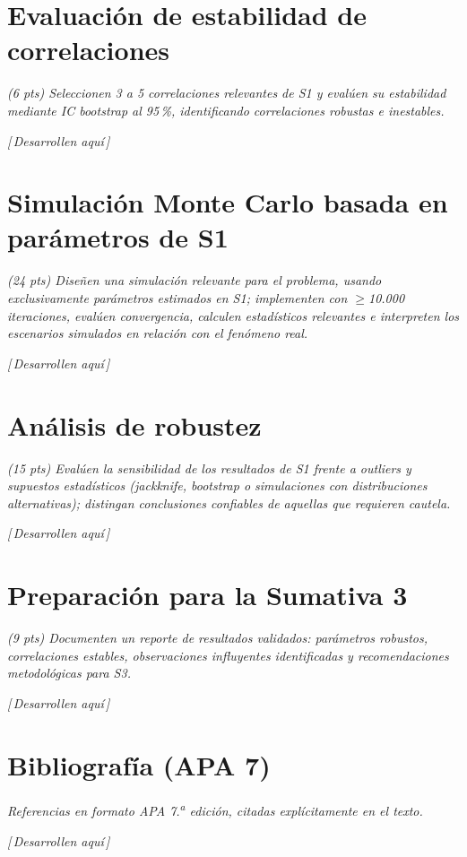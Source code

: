 \documentclass[11pt,a4paper]{article}
\newcommand{\guia}[1]{{\small\itshape\color{gris}#1}\par\vspace{0.15em}}
\newcommand{\resp}{{\footnotesize\itshape\color{fillgray}[\,Desarrollen aquí\,]}\par\vspace{1.1em}}
\begin{document}
\section{Evaluación de estabilidad de correlaciones}
\guia{(6 pts) Seleccionen 3 a 5 correlaciones relevantes de S1 y evalúen su estabilidad mediante IC bootstrap al 95\,\%, identificando correlaciones robustas e inestables.}
\resp

\section{Simulación Monte Carlo basada en parámetros de S1}
\guia{(24 pts) Diseñen una simulación relevante para el problema, usando exclusivamente parámetros estimados en S1; implementen con $\geq$10.000 iteraciones, evalúen convergencia, calculen estadísticos relevantes e interpreten los escenarios simulados en relación con el fenómeno real.}
\resp

\section{Análisis de robustez}
\guia{(15 pts) Evalúen la sensibilidad de los resultados de S1 frente a outliers y supuestos estadísticos (jackknife, bootstrap o simulaciones con distribuciones alternativas); distingan conclusiones confiables de aquellas que requieren cautela.}
\resp

\section{Preparación para la Sumativa 3}
\guia{(9 pts) Documenten un reporte de resultados validados: parámetros robustos, correlaciones estables, observaciones influyentes identificadas y recomendaciones metodológicas para S3.}
\resp

\section{Bibliografía (APA 7)}
\guia{Referencias en formato APA 7.\textsuperscript{a} edición, citadas explícitamente en el texto.}
\resp
\end{document}
